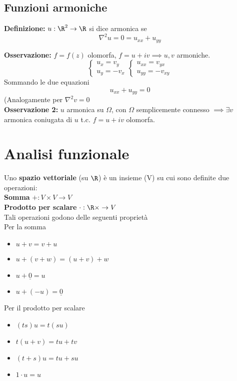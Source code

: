 \subsection{Funzioni armoniche}
\begin{tcolorbox}
	\textbf{Definizione:} $u:\R^2\to \R$ si dice armonica se 
	\[\nabla^2 u=0=u_{x x}+u_{y y}\]
\end{tcolorbox}
\textbf{Osservazione:} $f=f(z)$ olomorfa, $f=u+iv\implies u,v$ armoniche.
\[\begin{cases}
	u_x=v_y
	\\u_y=-v_x
\end{cases}
\begin{cases}
	u_{x x}=v_{y x}\\
	u_{y y}=-v_{xy}
\end{cases}
\]
Sommando le due equazioni
\[u_{x x}+u_{y y}=0\]
(Analogamente per $\nabla ^2 v=0$
\\\textbf{Osservazione 2:} $u$ armonica su $\Omega$, con $\Omega$ semplicemente connesso $\implies\exists v$ armonica coniugata di $u$ t.c. $f=u+iv$ olomorfa.

\section{Analisi funzionale}
Uno \textbf{spazio vettoriale} (su $\R$) è un insieme (V) su cui sono definite due operazioni:
\\\textbf{Somma} $+:V \times V\to V$
\\\textbf{Prodotto per scalare} $\cdot :\R \times \to V$
\\Tali operazioni godono delle seguenti proprietà
\\Per la somma
\begin{itemize}
	\item $u+v=v+u$ 
	\item $u+(v+w)=(u+v)+w$
	\item $u+\underline 0=u$
	\item $u+(-u)=\underline 0$
\end{itemize}
Per il prodotto per scalare
\begin{itemize}
	\item $(ts)u=t(su)$
	\item $t(u+v)=tu+tv$
	\item $(t+s)u=tu+su$
	\item $1\cdot u=u$
\end{itemize}
